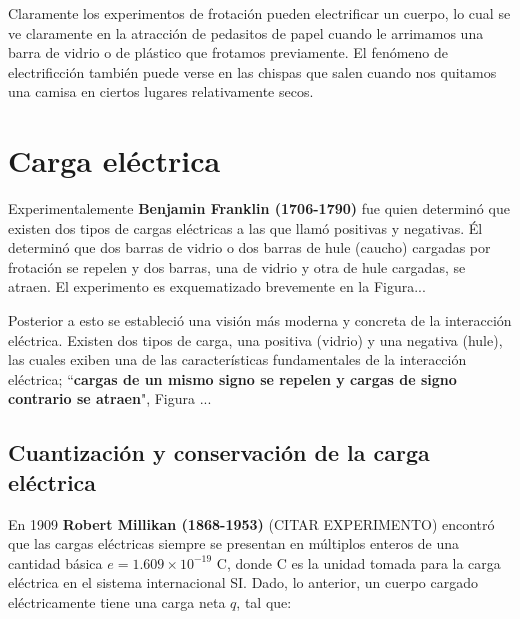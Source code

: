 %
%


Claramente los experimentos de frotación pueden electrificar un cuerpo, lo cual se ve claramente en la atracción de pedasitos de papel cuando le arrimamos una barra de vidrio o de plástico que frotamos previamente. El fenómeno de electrificción también puede verse en las chispas que salen cuando nos quitamos una camisa en ciertos lugares relativamente secos.

\section{Carga eléctrica}
Experimentalemente \textbf{Benjamin Franklin (1706-1790)} fue quien determinó que existen dos tipos de cargas eléctricas a las que llamó positivas y negativas. Él determinó que dos barras de vidrio o dos barras de hule (caucho) cargadas por frotación se repelen y dos barras, una de vidrio y otra de hule cargadas, se atraen. El experimento es exquematizado brevemente en la Figura... 

Posterior a esto se estableció una visión más moderna y concreta de la interacción eléctrica. Existen dos tipos de carga, una positiva (vidrio) y una negativa (hule), las cuales exiben una de las características fundamentales de la interacción eléctrica; ``\textbf{cargas de un mismo signo se repelen y cargas de signo contrario se atraen}", Figura ...

\subsection{Cuantización y conservación de la carga eléctrica}

En 1909 \textbf{Robert Millikan (1868-1953)} (CITAR EXPERIMENTO) encontró que las cargas eléctricas siempre se presentan en múltiplos enteros de una cantidad básica $e=1.609 \times 10^{-19}$ C, donde C es la unidad tomada para la carga eléctrica en el sistema internacional SI. Dado, lo anterior, un cuerpo cargado eléctricamente tiene una carga neta $q$, tal que:

